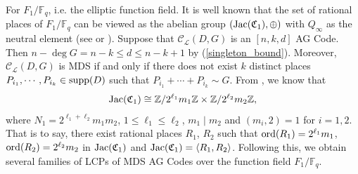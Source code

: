 \documentclass[journal,12pt,onecolumn]{IEEEtran}
\begin{document}
For $F_1/\mathbb{F}_q$, i.e. the elliptic function field. It is well known that the set of rational places of $F_1/\mathbb{F}_q$ can be viewed as the abelian group $({\rm Jac}(\mathfrak{C}_1),\oplus)$ with $Q_\infty$ as the neutral element (see \cite{The_Arithmetic_of_Elliptic_Curves} or \cite[Prop. 6.1.7]{Algebraic_Function_Fields_and_Codes}). Suppose that $\mathcal{C}_{\mathcal{L}}(D,G)$ is an $[n,k,d]$ AG Code. Then $n-\deg G=n-k\le d\le n-k+1$ by (\ref{singleton_bound}). Moreover, $\mathcal{C}_{\mathcal{L}}(D,G)$ is MDS if and only if there does not exist $k$ distinct places $P_{i_1},\cdots,P_{i_k}\in{\rm supp}(D)$ such that $P_{i_1}+\cdots+P_{i_k}\sim G$. From \cite[Thm. 4.1]{Elliptic_Curves:_Number_Theory_and_Cryptography}, we know that
\[
    {\rm Jac}(\mathfrak{C}_1)\cong\mathbb{Z}/2^{\ell_1}m_1\mathbb{Z}\times\mathbb{Z}/2^{\ell_2}m_2\mathbb{Z},
\]
where $N_1 = 2^{\ell_1+\ell_2}m_1m_2$, $1\le\ell_1\le\ell_2$, $m_1\mid m_2$ and $(m_i,2)=1$ for $i=1,2$. That is to say, there exist rational places $R_1$, $R_2$ such that ${\rm ord}(R_1)=2^{\ell_1}m_1$, ${\rm ord}(R_2)=2^{\ell_2}m_2$ in ${\rm Jac}(\mathfrak{C}_1)$ and ${\rm Jac}(\mathfrak{C}_1)=\langle R_1, R_2\rangle$. Following this, we obtain several families of LCPs of MDS AG Codes over the function field $F_1/\mathbb{F}_q$. 
\end{document}
